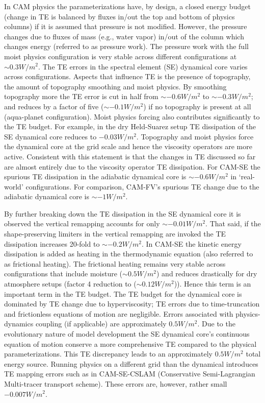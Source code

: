 \documentclass{agujournal}
\begin{document}
In CAM physics the parameterizations have, by design, a closed energy budget (change in TE is balanced by fluxes in/out the top and bottom of physics columns) if it is assumed that pressure is not modified. However, the pressure changes due to fluxes of mass (e.g., water vapor) in/out of the column which changes energy (referred to as pressure work). The pressure work with the full moist physics configuration is very stable across different configurations at $\sim 0.3W/m^2$. The TE errors in the spectral element (SE) dynamical core varies across configurations. Aspects that influence TE is the presence of topography, the amount of topography smoothing and moist physics. By smoothing topography more the TE error is cut in half from $\sim -0.6W/m^2$ to $\sim -0.3W/m^2$; and reduces by a factor of five ($\sim-0.1W/m^2$) if no topography is present at all (aqua-planet configuration). Moist physics forcing also contributes significantly to the TE budget. For example, in the dry Held-Suarez setup TE dissipation of the SE dynamical core reduces to $-0.03W/m^2$. Topography and moist physics force the dynamical core at the grid scale and hence the viscosity operators are more active. Consistent with this statement is that the changes in TE discussed so far are almost entirely due to the viscosity operator TE dissipation. For CAM-SE the spurious TE dissipation in the adiabatic dynamical core is $\sim-0.6W/m^2$ in `real-world' configurations. For comparison, CAM-FV's spurious TE change due to the adiabatic dynamical core is $\sim-1W/m^2$. 

By further breaking down the TE dissipation in the SE dynamical core it is observed the vertical remapping accounts for only $\sim-0.01W/m^2$. That said, if the shape-preserving limiters in the vertical remapping are invoked the TE dissipation increases 20-fold to $\sim-0.2W/m^2$. In CAM-SE the kinetic energy dissipation is added as heating in the thermodynamic equation (also referred to as frictional heating). The frictional heating remains very stable across configurations that include moisture ($\sim 0.5W/m^2$) and reduces drastically for dry atmosphere setups (factor 4 reduction to ($\sim 0.12W/m^2$)). Hence this term is an important term in the TE budget. The TE budget for the dynamical core is dominated by TE change due to hyperviscosity; TE errors due to time-truncation and frictionless equations of motion are negligible. Errors associated with physics-dynamics coupling (if applicable) are approximately $0.5W/m^2$. Due to the evolutionary nature of model development the SE dynamical core's continuous equation of motion conserve a more comprehensive TE compared to the physical parameterizations. This TE discrepancy leads to an approximately $0.5W/m^2$ total energy source. Running physics on a different grid than the dynamical introduces TE mapping errors such as in CAM-SE-CSLAM (Conservative Semi-Lagrangian Multi-tracer transport scheme). These errors are, however, rather small $-0.007W/m^2$.
\end{document}
